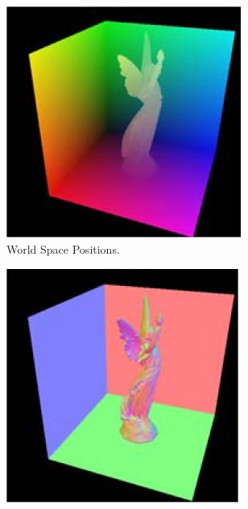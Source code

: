 \begin{figure}
\begin{subfigure}[b]{0.4\textwidth}
                \includegraphics[width=\textwidth]{RSM1.jpg}
                \caption{World Space Positions.}
                \label{fig:RSM1}
        \end{subfigure}
        \begin{subfigure}[b]{0.4\textwidth}
        		\centering
                \includegraphics[width=\textwidth]{RSM2.jpg}

\end{subfigure}
\end{figure}
